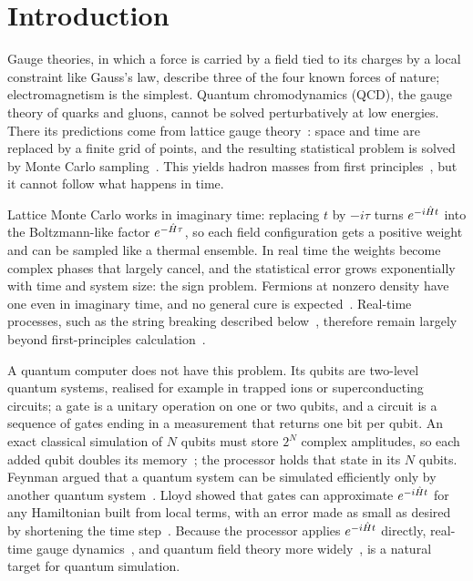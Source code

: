 \section{Introduction}
\label{sec:intro}

Gauge theories, in which a force is carried by a field tied to its charges by a
local constraint like Gauss's law, describe three of the four known forces of
nature; electromagnetism is the simplest. Quantum chromodynamics (QCD), the
gauge theory of quarks and gluons, cannot be solved perturbatively at low
energies. There its predictions come from lattice gauge
theory~\cite{wilson1974}: space and time are replaced by a finite grid of
points, and the resulting statistical problem is solved by Monte Carlo
sampling~\cite{creutz1980}. This yields hadron masses from first
principles~\cite{durr2008}, but it cannot follow what happens in time.

Lattice Monte Carlo works in imaginary time: replacing $t$ by $-i\tau$ turns
$e^{-i\hat{H} t}$ into the Boltzmann-like factor $e^{-\hat{H}\tau}$, so each field
configuration gets a positive weight and can be sampled like a thermal ensemble.
In real time the weights become complex phases that largely cancel, and the
statistical error grows exponentially with time and system size: the sign
problem. Fermions at nonzero density have one even in imaginary time, and no
general cure is expected~\cite{troyer2005}. Real-time
processes, such as the string breaking described below~\cite{hebenstreit2013},
therefore remain largely beyond first-principles
calculation~\cite{banuls2020,bauer2023}.

A quantum computer does not have this problem. Its qubits are two-level quantum
systems, realised for example in trapped ions or superconducting circuits; a
gate is a unitary operation on one or two qubits, and a circuit is a sequence of
gates ending in a measurement that returns one bit per qubit. An exact
classical simulation of $N$ qubits must store $2^N$ complex amplitudes, so each
added qubit doubles its memory~\cite{nielsen2010}; the processor holds that
state in its $N$ qubits. Feynman argued
that a quantum system can be simulated efficiently only by another quantum
system~\cite{feynman1982}. Lloyd showed that gates can approximate
$e^{-i\hat{H} t}$ for any Hamiltonian built from local terms, with an error made
as small as desired by shortening the time step~\cite{lloyd1996}. Because the
processor applies $e^{-i\hat{H} t}$ directly, real-time gauge
dynamics~\cite{georgescu2014,dalmonte2016}, and quantum field theory more
widely~\cite{jordan2012}, is a natural target for quantum simulation.

